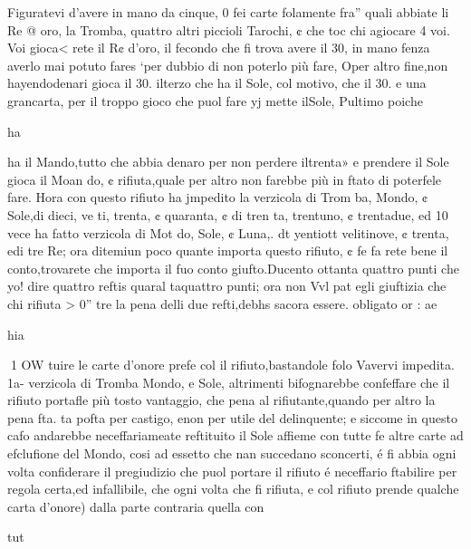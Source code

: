 \documentclass[12pt,a6paper]{article}
\begin{document}
 Figuratevi d’avere in mano
da cinque, 0 fei carte folamente fra” quali abbiate li Re @
oro, la Tromba, quattro altri piccioli Tarochi, ¢ che toc
chi agiocare 4 voi. Voi gioca<
rete il R¢ d’oro, il fecondo che
fi trova avere il 30, in mano
fenza averlo mai potuto fares
‘per dubbio di non poterlo più
fare, Oper altro fine,non hayendodenari gioca il 30. ilterzo
che ha il Sole, col motivo, che
il 30. e una grancarta, per il
troppo gioco che puol fare yj
mette ilSole, Pultimo poiche

ha

 

 

 

 
 

 

 

 

ha il Mando,tutto che abbia denaro per non perdere iltrenta»
e prendere il Sole gioca il Moan
do, ¢ rifiuta,quale per altro non
farebbe più in ftato di poterfele
fare. Hora con questo rifiuto ha
jmpedito la verzicola di Trom
ba, Mondo, ¢ Sole,di dieci, ve
ti, trenta, ¢ quaranta, ¢ di tren
ta, trentuno, ¢ trentadue, ed 10
vece ha fatto verzicola di Mot
do, Sole, ¢ Luna,. dt yentiott
velitinove, ¢ trenta, edi tre
Re; ora ditemiun poco quante
importa questo rifiuto, ¢ fe fa
rete bene il conto,trovarete che
importa il fuo conto giufto.Ducento ottanta quattro punti che
yo! dire quattro reftis quaral
taquattro punti; ora non Vvl pat
egli giuftizia che chi rifiuta > 0”
tre la pena delli due refti,debhs
sacora essere. obligato or :
ae

hia

 
1 OW
tuire le carte d’onore prefe col
il rifiuto,bastandole folo Vavervi impedita. 1a- verzicola di
Tromba Mondo, e Sole, altrimenti bifognarebbe confeffare
che il rifiuto portafle più tosto
vantaggio, che pena al rifiutante,quando per altro la pena fta.
ta pofta per castigo, enon per
utile del delinquente; e siccome
in questo cafo andarebbe neceffariameate reftituito il Sole affieme con tutte fe altre carte ad
efclufione del Mondo, cosi ad
essetto che nan succedano sconcerti, é fi abbia ogni volta
confiderare il pregiudizio che
puol portare il rifiuto é neceffario ftabilire per regola certa,ed infallibile, che ogni volta
che fi rifiuta, e col rifiuto
prende qualche carta d’onore)
dalla parte contraria quella con

tut
 

 

 
 
\end{document}
